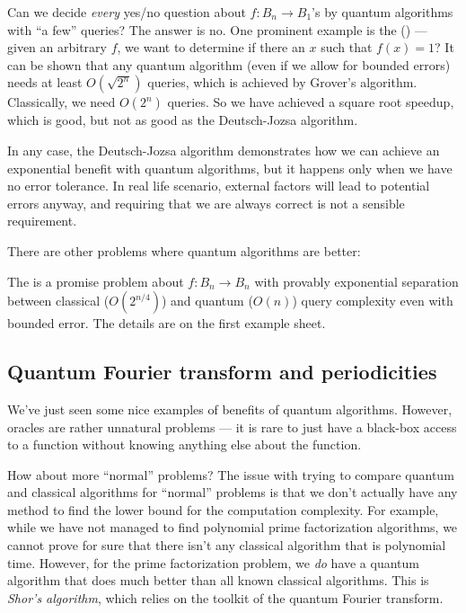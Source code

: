 Can we decide \emph{every} yes/no question about $f: B_n \to B_1$'s by quantum algorithms with ``a few'' queries? The answer is no. One prominent example is the  () --- given an arbitrary $f$, we want to determine if there an $x$ such that $f(x) = 1$? It can be shown that any quantum algorithm (even if we allow for bounded errors) needs at least $O(\sqrt{2^n})$ queries, which is achieved by Grover's algorithm. Classically, we need $O(2^n)$ queries. So we have achieved a square root speedup, which is good, but not as good as the Deutsch-Jozsa algorithm.

In any case, the Deutsch-Jozsa algorithm demonstrates how we can achieve an exponential benefit with quantum algorithms, but it happens only when we have no error tolerance. In real life scenario, external factors will lead to potential errors anyway, and requiring that we are always correct is not a sensible requirement.

There are other problems where quantum algorithms are better:
\begin{eg}
  The  is a promise problem about $f: B_n \to B_n$ with provably exponential separation between classical ($O(2^{n/4})$) and quantum ($O(n)$) query complexity even with bounded error. The details are on the first example sheet.
\end{eg}

\subsection{Quantum Fourier transform and periodicities}
We've just seen some nice examples of benefits of quantum algorithms. However, oracles are rather unnatural problems --- it is rare to just have a black-box access to a function without knowing anything else about the function.

How about more ``normal'' problems? The issue with trying to compare quantum and classical algorithms for ``normal'' problems is that we don't actually have any method to find the lower bound for the computation complexity. For example, while we have not managed to find polynomial prime factorization algorithms, we cannot prove for sure that there isn't any classical algorithm that is polynomial time. However, for the prime factorization problem, we \emph{do} have a quantum algorithm that does much better than all known classical algorithms. This is \emph{Shor's algorithm}, which relies on the toolkit of the quantum Fourier transform.

